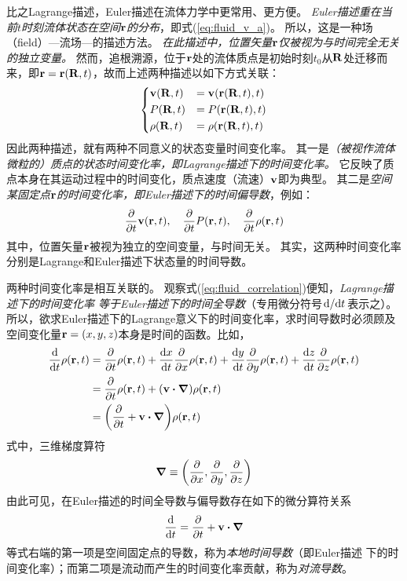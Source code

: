 \documentclass[UTF8]{ctexbook}
\begin{document}
比之Lagrange描述，Euler描述在流体力学中更常用、更方便。
\emph{Euler描述重在当前$t$时刻流体状态在空间$\vb{r}$的分布}，即式(\ref{eq:fluid_v_a})。
所以，这是一种场（field）---流场---的描述方法。
\emph{在此描述中，位置矢量$\vb{r}$仅被视为与时间完全无关的独立变量。}
然而，追根溯源，位于$\vb{r}$处的流体质点是初始时刻$t_0$从$\vb{R}$处迁移而
来，即$\vb{r}=\vb{r}(\vb{R},t)$，故而上述两种描述以如下方式关联：
\begin{equation}
	\begin{dcases}
		\vb{v}(\vb{R},t) & = \vb{v}\qty(\vb{r}(\vb{R},t),t)\\
		{P}(\vb{R},t) & = P\qty(\vb{r}(\vb{R},t),t)\\
		{\rho}(\vb{R},t) & =\rho\qty(\vb{r}(\vb{R},t),t)\\
	\end{dcases}
\label{eq:fluid_correlation}
\end{equation}
因此两种描述，就有两种不同意义的状态变量时间变化率。
其一是\emph{（被视作流体微粒的）质点的状态时间变化率，即Lagrange描述下的时间变化率。}
它反映了质点本身在其运动过程中的时间变化，质点速度（流速）$\vb{v}$即为典型。
其二是\emph{空间某固定点$\vb{r}$的时间变化率，即Euler描述下的时间偏导数}，例如：
$$
\pdv{t}\vb{v}(\vb{r},t)\qc 
\pdv{t}P(\vb{r},t)\qc 
\pdv{t}\rho(\vb{r},t)
$$
其中，位置矢量$\vb{r}$被视为独立的空间变量，与时间无关。
其实，这两种时间变化率分别是Lagrange和Euler描述下状态量的时间导数。

两种时间变化率是相互关联的。
观察式(\ref{eq:fluid_correlation})便知，\emph{Lagrange描述下的时间变化率
等于Euler描述下的时间全导数}（专用微分符号$\dv*{t}$表示之）。
所以，欲求Euler描述下的Lagrange意义下的时间变化率，求时间导数时必须顾及
空间变化量$\vb{r}=(x,y,z)$本身是时间的函数。比如，
\begin{align*}
	\dv{t} \rho(\vb{r},t) & = \pdv{t}\rho (\vb{r},t)+\dv{x}{t} \pdv{x}
	\rho(\vb{r},t) +\dv{y}{t} \pdv{y} \rho(\vb{r},t)+\dv{z}{t} \pdv{z} \rho
	(\vb{r},t)\\
	&=\pdv{t}\rho(\vb{r},t) + (\vb{v}\vdot \grad)\rho(\vb{r},t)\\
	&=\qty(\pdv{t} + \vb{v}\vdot \grad )\rho (\vb{r},t)
\end{align*}
式中，三维梯度算符
$$\grad \equiv \qty(\pdv{x}, \pdv{y}, \pdv{z})$$
由此可见，在Euler描述的时间全导数与偏导数存在如下的微分算符关系
\begin{equation}
	\dv{t} = \pdv{t} + \vb{v}\vdot \grad
	\label{eq:fluid_dt}
\end{equation}
等式右端的第一项是空间固定点的导数，称为\emph{本地时间导数}（即Euler描述
下的时间变化率）；而第二项是流动而产生的时间变化率贡献，称为\emph{对流导数}。
\end{document}

